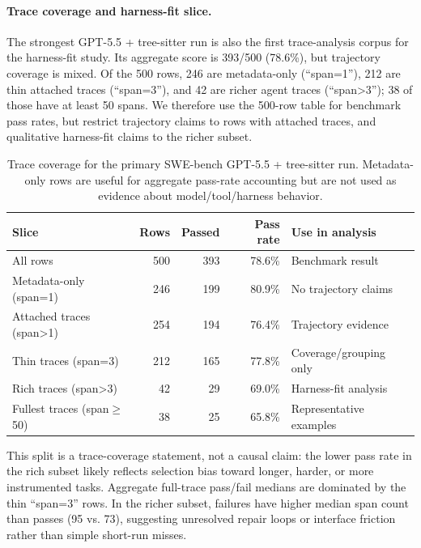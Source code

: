 \documentclass[11pt, logo, onecolumn, copyright, colorlinks=true, allcolors=blue]{nvidiatechreport}
\begin{document}
\paragraph{Trace coverage and harness-fit slice.}
The strongest GPT-5.5 + tree-sitter run is also the first trace-analysis
corpus for the harness-fit study. Its aggregate score is 393/500 (78.6\%), but
trajectory coverage is mixed. Of the 500 rows, 246 are metadata-only
(``span=1''), 212 are thin attached traces (``span=3''), and 42 are richer
agent traces (``span>3''); 38 of those have at least 50 spans. We therefore use
the 500-row table for benchmark pass rates, but restrict trajectory claims to
rows with attached traces, and qualitative harness-fit claims to the richer
subset.

\begin{table}[h]
\centering
\caption{Trace coverage for the primary SWE-bench GPT-5.5 + tree-sitter run.
Metadata-only rows are useful for aggregate pass-rate accounting but are not
used as evidence about model/tool/harness behavior.}
\label{tab:swebench-trace-coverage}
\begin{tabular}{lrrrl}
\toprule
\textbf{Slice} & \textbf{Rows} & \textbf{Passed} & \textbf{Pass rate} & \textbf{Use in analysis} \\
\midrule
All rows & 500 & 393 & 78.6\% & Benchmark result \\
Metadata-only (span=1) & 246 & 199 & 80.9\% & No trajectory claims \\
Attached traces (span>1) & 254 & 194 & 76.4\% & Trajectory evidence \\
Thin traces (span=3) & 212 & 165 & 77.8\% & Coverage/grouping only \\
Rich traces (span>3) & 42 & 29 & 69.0\% & Harness-fit analysis \\
Fullest traces (span$\ge$50) & 38 & 25 & 65.8\% & Representative examples \\
\bottomrule
\end{tabular}
\end{table}

This split is a trace-coverage statement, not a causal claim: the lower pass
rate in the rich subset likely reflects selection bias toward longer, harder,
or more instrumented tasks. Aggregate full-trace pass/fail medians are dominated
by the thin ``span=3'' rows. In the richer subset, failures have higher median
span count than passes (95 vs. 73), suggesting unresolved repair loops or
interface friction rather than simple short-run misses.
\end{document}

